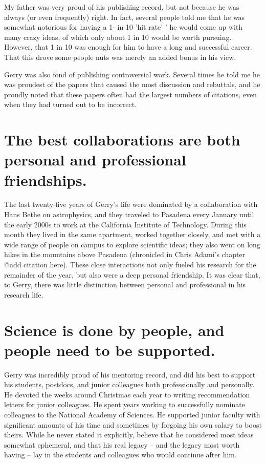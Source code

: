 My father was very proud of his publishing record, but not because he
was always (or even frequently) right. In fact, several people told me
that he was somewhat notorious for having a 1- in-10 'hit rate' ' he
would come up with many crazy ideas, of which only about 1 in 10 would
be worth pursuing. However, that 1 in 10 was enough for him to have a
long and successful career.  That this drove some people nuts was
merely an added bonus in his view.

Gerry was also fond of publishing controversial work. Several times he
told me he was proudest of the papers that caused the most discussion
and rebuttals, and he proudly noted that these papers often had the
largest numbers of citations, even when they had turned out to be
incorrect.

\section{The best collaborations are both personal and professional
friendships.}

The last twenty-five years of Gerry's life were dominated by a
collaboration with Hans Bethe on astrophysics, and they traveled to
Pasadena every January until the early 2000s to work at the California
Institute of Technology. During this month they lived in the same
apartment, worked together closely, and met with a wide range of
people on campus to explore scientific ideas; they also went on long
hikes in the mountains above Pasadena (chronicled in Chris Adami's
chapter @add citation here). These close interactions not only fueled
his research for the remainder of the year, but also were a deep
personal friendship. It was clear that, to Gerry, there was little
distinction between personal and professional in his research life.

\section{Science is done by people, and people need to be supported.}

Gerry was incredibly proud of his mentoring record, and did his best
to support his students, postdocs, and junior colleagues both
professionally and personally. He devoted the weeks around Christmas
each year to writing recommendation letters for junior colleagues. He
spent years working to successfully nominate colleagues to the
National Academy of Sciences. He supported junior faculty with
significant amounts of his time and sometimes by forgoing his own
salary to boost theirs. While he never stated it explicitly, believe
that he considered most ideas somewhat ephemeral, and that his real
legacy --  and the legacy most worth having -- lay in the students and
colleagues who would continue after him.

